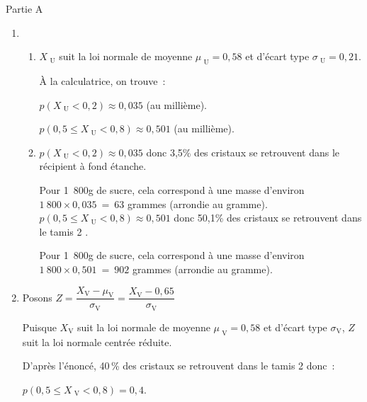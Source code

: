 \begin{corrige}
     \begin{center}\begin{h3}Partie A \end{h3}\end{center}
     \begin{enumerate}
          \item
          \begin{enumerate}[label=\alph*.]
               \item
               $X_{\text{ U}}$ suit la loi normale de moyenne $\mu_{\text{ U}} = 0,58$ et d'écart type $\sigma_{\text{ U}} = 0,21$.
               \par
               \`A la calculatrice, on trouve~:
               \par
               $p\left(X_{\text{ U}}<0,2 \right)\approx 0,035$  (au millième).
               \par
               $p\left(0,5 \leqslant  X_{\text{ U}} < 0,8 \right)\approx 0,501$  (au millième).
               \item
               $p\left(X_{\text{ U}}<0,2 \right)\approx 0,035$ donc 3,5\% des cristaux se retrouvent dans le récipient à fond étanche.
               \par
               Pour 1~800g de sucre, cela correspond à une masse d'environ $1~800 \times  0,035~=~63$ grammes (arrondie au gramme).
               \smallskip
               $p\left(0,5 \leqslant  X_{\text{ U}}<0,8 \right)\approx 0,501$ donc 50,1\% des cristaux se retrouvent dans le tamis 2 .
               \par
               Pour 1~800g de sucre, cela correspond à une masse d'environ $1~800 \times   0,501~=~902 $ grammes (arrondie au gramme).
          \end{enumerate}
          \item
          Posons  $Z=\dfrac{X_{\text{V}}-\mu_{\text{V}}}{\sigma_{\text{V}}} = \dfrac{X_{\text{V}}-0,65}{\sigma_{\text{V}}}$
          \par
          Puisque $X_{\text{V}}$ suit la loi normale de moyenne $\mu_{\text{ V}} = 0,58$ et d'écart type $\sigma_{\text{V}}$, $Z$ suit la loi normale centrée réduite.
          \par
          D'après l'énoncé, 40\,\% des cristaux se retrouvent dans le tamis 2 donc~:
          \par
          $p\left(0,5 \leqslant X_{\text{ V}}<0,8 \right)= 0,4$.
          \par

\end{enumerate}
\end{corrige}
